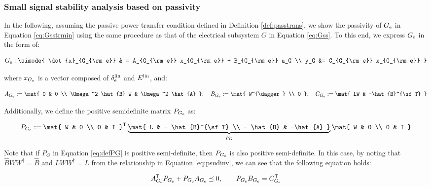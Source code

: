 \documentclass[graybox, envcountchap]{svmult}
\begin{document}
\smallskip
\subsubsection{Small signal stability analysis based on passivity}

In the following, assuming the passive power transfer condition defined in
Definition \ref{def:passtrans}, we show the passivity of $G_{\rm e}$ in Equation
\ref{eq:Gsstrmin} using the same procedure as that of the electrical subsystem
$G$ in Equation \ref{eq:Gss}. To this end, we express $G_{\rm e}$ in the form
of:

\begin{equation}\label{eq:Gecomdef}
  G_{\rm e}: \simode{
    \dot{x}_{G_{\rm e}} & = A_{G_{\rm e}} x_{G_{\rm e}} + B_{G_{\rm e}} u_G \\
    y_G &= C_{G_{\rm e}} x_{G_{\rm e}}
  }
\end{equation}

where $x_{G_{\rm e}}$ is a vector composed of ${\delta}^{\rm lin}_{\rm e}$ and
$E^{\rm lin}$, and:

\[
  A_{G_{\rm e}} := 
  \mat{
  0 & 0 \\
  \Omega^2 \hat{B} W  &  \Omega^2 \hat{A} 
  },\quad
  B_{G_{\rm e}} := 
  \mat{
  W^{\dagger} \\
  0
  },\quad
  C_{G_{\rm e}} := 
  \mat{
  LW & -\hat{B}^{\sf T}
}
\]

Additionally, we define the positive semidefinite matrix $P_{G_{\rm e}}$ as:

\begin{equation}\label{eq:defPGe}
  P_{G_{\rm e}} := 
  \mat{
  W & 0 \\
  0 & I
  }^{\sf T}
  \underbrace{
  \mat{
  L  &  - \hat{B}^{\sf T} \\
  - \hat{B} & -\hat{A}
  }
  }_{P_G}
  \mat{
  W & 0 \\
  0 & I
  }
\end{equation}

Note that if $P_G$ in Equation \ref{eq:defPG} is positive semi-definite, then
$P_{G_{\rm e}}$ is also positive semi-definite. In this case, by noting that
$\hat{B}WW^{\dagger}=\hat{B}$ and $LWW^{\dagger}=L$ from the relationship in
Equation \ref{eq:psudinv}, we can see that the following equation holds:

\begin{equation}\label{eq:Gelmi}
  A^{\sf T}_{G_{\rm e}} P_{G_{\rm e}} + P_{G_{\rm e}} A_{G_{\rm e}} \preceq 
  0
  ,\qquad
  P_{G_{\rm e}} B_{G_{\rm e}} = C_{G_{\rm e}}^{\sf T}
\end{equation}
\end{document}
